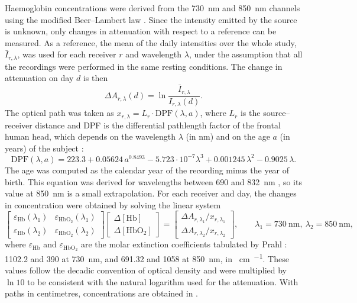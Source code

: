 \documentclass[11pt,a4paper]{article}
\begin{document}
Haemoglobin concentrations were derived from the \SI{730}{\nano\metre} and
\SI{850}{\nano\metre} channels using the modified Beer--Lambert law
\citep{delpy1988}. Since the intensity emitted by the source is unknown, only changes
in attenuation with respect to a reference can be measured. As a reference, the mean
of the daily intensities over the whole study, $\bar{I}_{r,\lambda}$, was used for each
receiver $r$ and wavelength $\lambda$, under the assumption that all the recordings were
performed in the same resting conditions. The change in attenuation on day $d$ is then
\begin{equation}
  \Delta A_{r,\lambda}(d) = \ln\frac{\bar{I}_{r,\lambda}}{I_{r,\lambda}(d)} .
\end{equation}
The optical path was taken as $x_{r,\lambda} = L_r \cdot \mathrm{DPF}(\lambda, a)$, where
$L_r$ is the source--receiver distance and DPF is the differential pathlength factor of
the frontal human head, which depends on the wavelength $\lambda$ (in nm) and on the age
$a$ (in years) of the subject \citep{scholkmann2013}:
\begin{equation}
  \mathrm{DPF}(\lambda, a) = 223.3 + 0.05624\,a^{0.8493} - 5.723\cdot10^{-7}\lambda^3
  + 0.001245\,\lambda^2 - 0.9025\,\lambda .
\end{equation}
The age was computed as the calendar year of the recording minus the year of birth.
This equation was derived for wavelengths between 690 and \SI{832}{\nano\metre}
\citep{scholkmann2013}, so its value at \SI{850}{\nano\metre} is a small extrapolation.
For each receiver and day, the changes in concentration were obtained by solving the
linear system
\begin{equation}
  \begin{bmatrix}
    \varepsilon_{\mathrm{Hb}}(\lambda_1) & \varepsilon_{\mathrm{HbO_2}}(\lambda_1) \\
    \varepsilon_{\mathrm{Hb}}(\lambda_2) & \varepsilon_{\mathrm{HbO_2}}(\lambda_2)
  \end{bmatrix}
  \begin{bmatrix} \Delta[\mathrm{Hb}] \\ \Delta[\mathrm{HbO_2}] \end{bmatrix}
  =
  \begin{bmatrix}
    \Delta A_{r,\lambda_1} / x_{r,\lambda_1} \\
    \Delta A_{r,\lambda_2} / x_{r,\lambda_2}
  \end{bmatrix},
  \qquad \lambda_1 = \SI{730}{\nano\metre},\ \lambda_2 = \SI{850}{\nano\metre},
\end{equation}
where $\varepsilon_{\mathrm{Hb}}$ and $\varepsilon_{\mathrm{HbO_2}}$ are the molar
extinction coefficients tabulated by Prahl \citep{prahl_hb}: 1102.2 and 390 at
\SI{730}{\nano\metre}, and 691.32 and 1058 at \SI{850}{\nano\metre}, in
\si{\per\centi\metre\per\molar}. These values follow the decadic convention of optical
density and were multiplied by $\ln 10$ to be consistent with the natural logarithm used
for the attenuation. With paths in centimetres, concentrations are obtained in
\si{\molar}.
\end{document}
